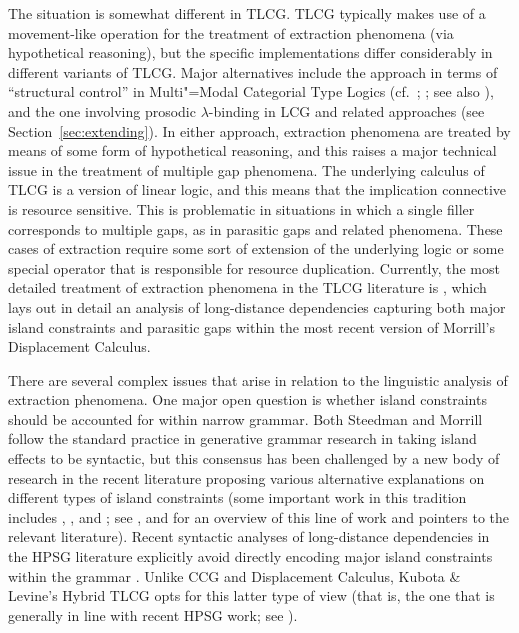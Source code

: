 \documentclass[output=paper
                ,modfonts
 	        ,biblatex
                ,babelshorthands
                ,newtxmath
                ,draftmode
                ,colorlinks, citecolor=brown
]{langscibook}
\begin{document}
The situation is somewhat different in TLCG. TLCG typically makes use
of a movement-like operation for the treatment of extraction
phenomena (via hypothetical reasoning), but the specific implementations differ considerably in
different variants of TLCG. Major alternatives include the approach in
terms of   ``structural control'' in Multi"=Modal Categorial Type
Logics (cf.~\citealt[Chapter 1]{BernardiPhD}; \citealt[Section~2.4]{Moortgat2011a-u};
see also \citealt[Chapter 7]{Morrill94a-u}), and the one involving prosodic
$\lambda$-binding in LCG and related approaches (see
Section~\ref{sec:extending}). In either approach, extraction phenomena
are treated by means of some form of hypothetical reasoning, and this
raises a major technical issue in the treatment of multiple gap
phenomena. The underlying calculus of TLCG is a version of linear
logic, and this means that the implication connective is resource
sensitive. This is problematic in situations in which a single filler
corresponds to multiple gaps, as in parasitic gaps and related
phenomena. These cases of extraction require some sort of extension of
the underlying logic or some special operator that is responsible for
resource duplication. Currently, the most detailed treatment of
extraction phenomena in the TLCG literature is \citet{morrilllp},
which lays out in detail an analysis of long-distance dependencies
capturing both major island constraints and parasitic gaps within the
most recent version of Morrill's Displacement Calculus.

There are several complex issues that arise in relation to the
linguistic analysis of extraction phenomena. One major open question
is whether island constraints should be accounted for within narrow
grammar. Both Steedman and Morrill follow the standard practice in
generative grammar research in taking island effects to be syntactic,
but this consensus has been challenged by a new body of research in
the recent literature proposing various alternative explanations on
different types of island constraints (some important work in this
tradition includes \citealt{deaneBook}, \citealt{kluender98},
\citealt{HS2010a-u} and \citealt{CP2020a-u}; see
, \citealt{levine2017} and
\citealt{newmeyer2016} for an overview of this line of work and pointers
to the relevant literature). Recent syntactic analyses of
long-distance dependencies in the HPSG literature explicitly avoid
directly encoding major island constraints within the grammar
\citep{Sag2010b,chaves12b}. Unlike CCG and Displacement Calculus,
Kubota \& Levine's Hybrid TLCG opts for this latter type of view (that
is, the one that is generally in line with recent HPSG work; see
\citealt[Chapter 10]{KubotaLevineBook}).
\end{document}
